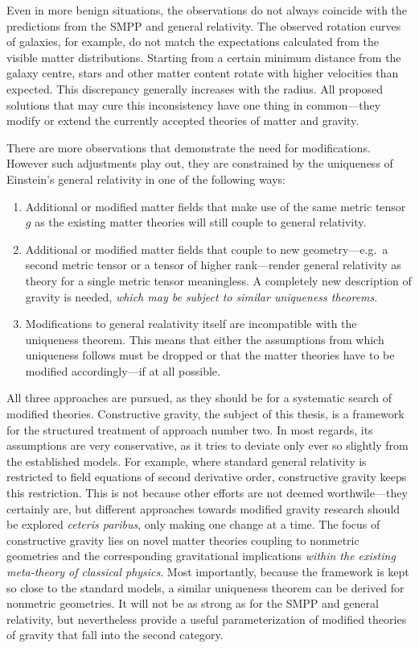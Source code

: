 Even in more benign situations, the observations do not always coincide with the predictions from the SMPP and general relativity. The observed rotation curves of galaxies, for example, do not match the expectations calculated from the visible matter distributions. Starting from a certain minimum distance from the galaxy centre, stars and other matter content rotate with higher velocities than expected. \cite{} This discrepancy generally increases with the radius. \cite{} All proposed solutions \cite{} that may cure this inconsistency have one thing in common---they modify or extend the currently accepted theories of matter and gravity.

There are more observations \cite{} that demonstrate the need for modifications. However such adjustments play out, they are constrained by the uniqueness of Einstein's general relativity in one of the following ways:
\begin{enumerate}
  \item Additional or modified matter fields that make use of the same metric tensor $g$ as the existing matter theories will still couple to general relativity.
  \item Additional or modified matter fields that couple to new geometry---e.g.~a second metric tensor or a tensor of higher rank---render general relativity as theory for a single metric tensor meaningless. A completely new description of gravity is needed, \emph{which may be subject to similar uniqueness theorems}.
  \item Modifications to general realativity itself are incompatible with the uniqueness theorem. This means that either the assumptions from which uniqueness follows must be dropped or that the matter theories have to be modified accordingly---if at all possible.
\end{enumerate}
All three approaches are pursued, as they should be for a systematic search of modified theories. Constructive gravity, the subject of this thesis, is a framework for the structured treatment of approach number two. In most regards, its assumptions are very conservative, as it tries to deviate only ever so slightly from the established models. For example, where standard general relativity is restricted to field equations of second derivative order, constructive gravity keeps this restriction. This is not because other efforts are not deemed worthwile---they certainly are, but different approaches towards modified gravity research should be explored \emph{ceteris paribus}, only making one change at a time. The focus of constructive gravity lies on novel matter theories coupling to nonmetric geometries and the corresponding gravitational implications \emph{within the existing meta-theory of classical physics}. Most importantly, because the framework is kept so close to the standard models, a similar uniqueness theorem can be derived for nonmetric geometries. It will not be as strong as for the SMPP and general relativity, but nevertheless provide a useful parameterization of modified theories of gravity that fall into the second category.

